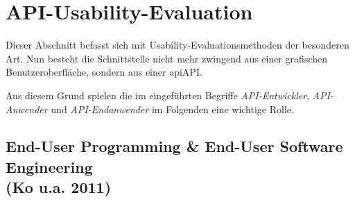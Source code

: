 \section{API-Usability-Evaluation}
\label{sec:api-usability-evaluation}

Dieser Abschnitt befasst sich mit Usability-Evaluationsmethoden der besonderen Art. Nun besteht die Schnittstelle nicht mehr zwingend aus einer grafischen Benutzeroberfläche, sondern aus einer \acrshort{api}{API}.

Aus diesem Grund spielen die im  eingeführten Begriffe \textit{API-Entwickler}, \textit{API-Anwender} und \textit{API-Endanwender} im Folgenden eine wichtige Rolle.

\subsection{End-User Programming \& End-User Software Engineering\\(Ko u.a. 2011)}
\label{sec:euse}

